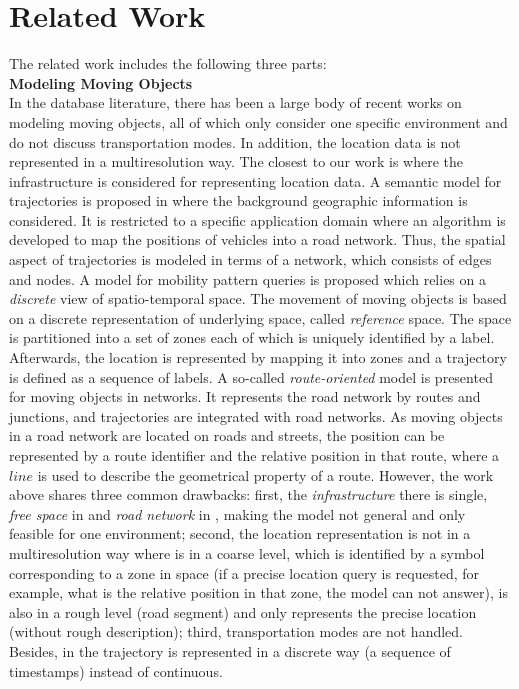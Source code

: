 \section{Related Work}
\label{sec:relatedwork}
The related work includes the following three parts: \\

\textbf{Modeling Moving Objects} \\

In the database literature, there has been a large body of recent works 
\cite{PO+97,WX+98,GBE+00,FG+00,SXI01,WCKY01,HJ2003,SJ2003,BPT04,
DG2004,MR05,GA2006,KO07,PS07,JLSZ08,JLY209} 
on modeling moving objects, all of which only consider one specific environment and do not
discuss transportation modes. In addition, the location data is not represented in a 
multiresolution way. The closest to our work is \cite{BPT04,MR05,GA2006} 
where the infrastructure is considered for representing location data. 
A semantic model for trajectories is proposed in \cite{BPT04} where the background geographic information is considered. It is restricted to a specific
application domain where an algorithm is developed to map the positions of vehicles into a 
road network. Thus, the spatial aspect of trajectories is modeled in terms of a network, which consists of edges and nodes. A model for mobility pattern queries \cite{MR05} is 
proposed which relies on a \textit{discrete} view of spatio-temporal space. The movement of 
moving objects is based on a discrete representation of underlying space, 
called \textit{reference} space. The space is partitioned into a set of zones each of which is uniquely 
identified by a label. Afterwards, the location is represented by mapping it into zones and 
a trajectory is defined as a sequence of labels. A so-called \textit{route-oriented} model 
\cite{GA2006} is presented for moving objects in networks. It represents the road 
network by routes and junctions, and trajectories are integrated with road networks. 
As moving objects in a road network are located on roads and streets, 
the position can be represented by a route identifier 
and the relative position in that route, where a $line$ is used to describe the 
geometrical property of a route. However, the work above shares three common drawbacks: first, the \textit{infrastructure} there is
single, \textit{free space} in \cite{MR05} and \textit{road network} in \cite{BPT04,GA2006}, making the 
model not general and only feasible for one environment; 
second, the location representation is not in a multiresolution way where 
\cite{MR05} is in a coarse level, which is identified by a symbol corresponding to a zone 
in space (if a precise location query is requested, for example, what is the relative position in 
that zone, the model can not answer), \cite{BPT04} is also in a rough level (road segment)
and \cite{GA2006} only represents the precise location (without rough description); 
third, transportation modes are not handled. Besides, in \cite{MR05} the trajectory is represented in a discrete way (a sequence of timestamps) instead of continuous. \\

